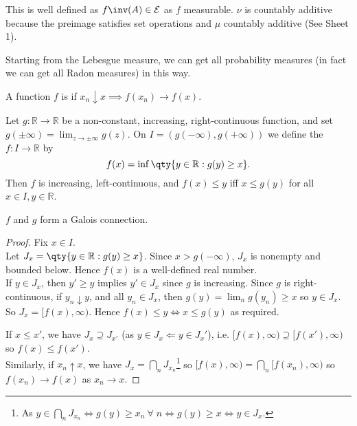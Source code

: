 \begin{remark}
	This is well defined as $f\inv(A) \in \mathcal{E}$ as $f$ measurable. $\nu$ is countably additive because the preimage satisfies set operations and $\mu$ countably additive (See Sheet 1).
\end{remark}

Starting from the Lebesgue measure, we can get all probability measures (in fact we can get all Radon measures) in this way.

\begin{definition}
	A function $f$ is  if $x_n \downarrow x \implies f(x_n) \to f(x)$.
\end{definition}

\begin{lemma}
	Let $g \colon \mathbb R \to \mathbb R$ be a non-constant, increasing, right-continuous function, and set $g(\pm\infty) = \lim_{z \to \pm \infty} g(z)$.
	On $I = (g(-\infty), g(+\infty))$ we define the  $f : I \to \mathbb{R}$ by
	\[ f(x) = \inf \qty{y \in \mathbb R : g(y) \geq x}. \]
	Then $f$ is increasing, left-continuous, and $f(x) \leq y$ iff $x \leq g(y)$ for all $x \in I, y \in \mathbb R$.
\end{lemma}

\begin{remark}
	$f$ and $g$ form a Galois connection.
\end{remark}

\begin{proof}
	Fix $x \in I$. \\
	Let $J_x = \qty{y \in \mathbb R : g(y) \geq x}$.
	Since $x > g(-\infty)$, $J_x$ is nonempty and bounded below.
	Hence $f(x)$ is a well-defined real number. \\
	If $y \in J_x$, then $y' \geq y$ implies $y' \in J_x$ since $g$ is increasing.
	Since $g$ is right-continuous, if $y_n \downarrow y$, and all $y_n \in J_x$, then $g(y) = \lim_n g(y_n) \geq x$ so $y \in J_x$. \\
	So $J_x = [f(x), \infty)$.
	Hence $f(x) \leq y \iff x \leq g(y)$ as required.

	If $x \leq x'$, we have $J_x \supseteq J_{x'}$ (as $y \in J_x \Longleftarrow y \in J_x'$), i.e. $[f(x), \infty) \supseteq [f(x'), \infty)$ so $f(x) \leq f(x')$. \\
	Similarly, if $x_n \uparrow x$, we have $J_x = \bigcap_n J_{x_n}$\footnote{As $y \in \bigcap_n J_{x_n} \iff g(y) \geq x_n \ \forall \; n \iff g(y) \geq x \iff y \in J_x$.} so $[f(x), \infty) = \bigcap_n [f(x_n), \infty)$ so $f(x_n) \to f(x)$ as $x_n \to x$.
\end{proof}

